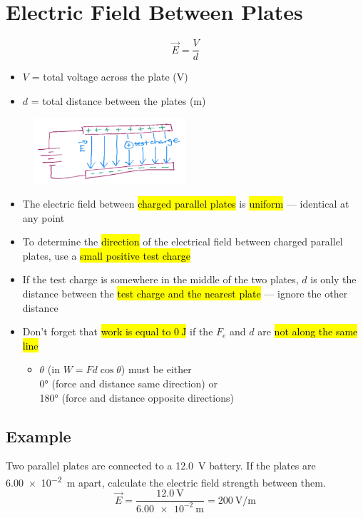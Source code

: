 \documentclass[a4paper,12pt]{article}
\begin{document}
\section{Electric Field Between Plates}
\Large $$\vec{E} = \frac{V}{d}$$ \normalsize
\begin{itemize}
    \item{$V$ = total voltage across the plate (\si{\volt})}
    \item{$d$ = total distance between the plates (\si{\meter})}
\end{itemize}

\begin{figure}[H]
    \centering
    \includegraphics[width=0.50\textwidth]{plate}
\end{figure}

\begin{itemize}
    \item{The electric field between \hl{charged parallel plates} is \hl{uniform} --- identical at any point}
    \item{To determine the \hl{direction} of the electrical field between charged parallel plates, use a \hl{small positive test charge}}
    \item{If the test charge is somewhere in the middle of the two plates, $d$ is only the distance between the \hl{test charge and the nearest plate} --- ignore the other distance}
    \item{
        Don't forget that \hl{work is equal to $\SI{0}{\joule}$} if the $F_e$ and $d$ are \hl{not along the same line}
        \begin{itemize}
            \item{$\theta$ (in $W = Fd\cos{\theta}$) must be either\\\ang{0} (force and distance same direction) or \\\ang{180} (force and distance opposite directions)}
        \end{itemize}
    }
\end{itemize}

\subsection{Example}
Two parallel plates are connected to a \SI{12.0}{\volt} battery. If the plates are \SI{6.00e-2}{\m} apart, calculate the electric field strength between them.
$$\vec{E} = \frac{\SI{12.0}{\volt}}{\SI{6.00e-2}{\m}} = \SI{200}{\volt\per\m}$$
\end{document}
